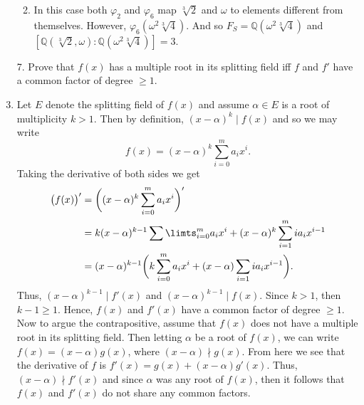 \documentclass[12pt]{article}
\makeatletter
\theoremstyle{definition}
\theoremstyle{remark}
\renewenvironment{proof}[1][\proofname]{\par
  \pushQED{\qed}%
  \normalfont \topsep6\p@\@plus6\p@\relax
  \list{}{\leftmargin=0mm
          \rightmargin=4mm
          \settowidth{\itemindent}{\itshape#1}%
          \labelwidth=\itemindent
          \parsep=0pt \listparindent=\parindent 
  }
  \item[\hskip\labelsep
        \itshape
    #1\@addpunct{.}]\ignorespaces
}{%
  \popQED\endlist\@endpefalse
}
\newenvironment{solution}[1][\bf{\textit{Solution}}]{\par
  
  \normalfont \topsep6\p@\@plus6\p@\relax
  \list{}{\leftmargin=0mm
          \rightmargin=4mm
          \settowidth{\itemindent}{\itshape#1}%
          \labelwidth=\itemindent
          \parsep=0pt \listparindent=\parindent 
  }
  \item[\hskip\labelsep
        \itshape
    #1\@addpunct{.}]\ignorespaces
}{%
  \popQED\endlist\@endpefalse
}
\let\oldproofname=\proofname
\renewcommand{\proofname}{\bf{\textit{\oldproofname}}}
\makeatother
\begin{document}
\begin{enumerate}[leftmargin=*]
\begin{enumerate}
                    \begin{solution}
                        In this case both $\varphi_2$ and $\varphi_6$ map $\sqrt[3]{2}$ and $\omega$ to elements different from themselves. However, $\varphi_6(\omega^2\sqrt[3]{4})$. And so $F_S=\mathbb{Q}(\omega^2\sqrt[3]{4})$ and $[\mathbb{Q}(\sqrt[3]{2},\omega)\colon\mathbb{Q}(\omega^2\sqrt[3]{4})]=3$.
                    \end{solution}
            \end{enumerate}
        \item[7.] Prove that $f(x)$ has a multiple root in its splitting field iff $f$ and $f'$ have a common factor of degree $\geq 1$.
            \begin{proof}
                Let $E$ denote the splitting field of $f(x)$ and assume $\alpha\in E$ is a root of multiplicity $k>1$. Then by definition, $(x-\alpha)^k\mid f(x)$ and so we may write
                    \begin{equation*}
                        f(x)=(x-\alpha)^k\sum\limits_{i=0}^ma_ix^i.
                    \end{equation*}
                Taking the derivative of both sides we get
                    \begin{equation*}
                        \begin{split}
                            \big(f(x)\big)' &= \bigg((x-\alpha)^k\sum\limits_{i=0}^ma_ix^i\bigg)'\\
                            &=k(x-\alpha)^{k-1}\sum\limts_{i=0}^ma_ix^i+(x-\alpha)^k\sum\limits_{i=1}^mia_ix^{i-1} \\
                            &= (x-\alpha)^{k-1}\bigg(k\sum\limits_{i=0}^ma_ix^i+(x-\alpha)\sum\limits_{i=1}ia_ix^{i-1}\bigg).
                        \end{split}
                    \end{equation*}
                Thus, $(x-\alpha)^{k-1}\mid f'(x)$ and $(x-\alpha)^{k-1}\mid f(x)$. Since $k>1$, then $k-1\geq 1$. Hence, $f(x)$ and $f'(x)$ have a common factor of degree $\geq 1$. Now to argue the contrapositive, assume that $f(x)$ does not have a multiple root in its splitting field. Then letting $\alpha$ be a root of $f(x)$, we can write $f(x)=(x-\alpha)g(x)$, where $(x-\alpha)\nmid g(x)$. From here we see that the derivative of $f$ is $f'(x)=g(x)+(x-\alpha)g'(x)$. Thus, $(x-\alpha)\nmid f'(x)$ and since $\alpha$ was any root of $f(x)$, then it follows that $f(x)$ and $f'(x)$ do not share any common factors.
            \end{proof}

\end{enumerate}
\end{document}
